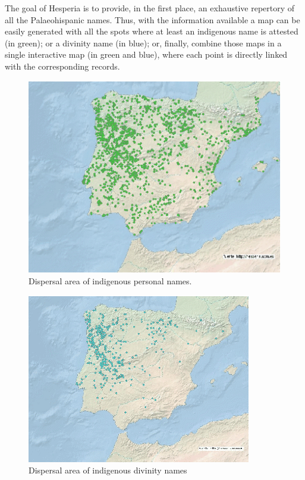 \documentclass[amsthm,ebook]{saparticle}
\begin{document}
The goal of Hesperia is to provide, in the first place, an exhaustive repertory of all the Palaeohispanic names. Thus,
with the information available a map can be easily generated with all the spots where at least an indigenous name is
attested (in green); or a divinity name (in blue); or, finally, combine those maps in a single interactive map (in
green and blue), where each point is directly linked with the corresponding records.

\begin{figure}[!bp]
\centering
 \includegraphics[width=\columnwidth]{EpigraphyandonomasticsinHesperiadatabanktemplate-img005.png}
\caption{Dispersal area of indigenous personal names.}
\label{fig:5}
\end{figure}


\begin{figure}[!bp]
\centering
 \includegraphics[width=\columnwidth]{EpigraphyandonomasticsinHesperiadatabanktemplate-img006.png}
\caption{Dispersal area of indigenous divinity names}
\label{fig:}
\end{figure}
\end{document}

